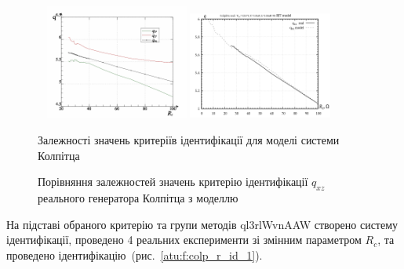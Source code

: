\documentclass[a4paper,13pt]{atuaref}
\begin{document}
\begin{figure}[htb!]
\begin{center}
  ~ \hfill
  \includegraphics[width=0.42\textwidth]{p6/p/colp_read_q-p_Rc_q.png}
  \hfill
  \includegraphics[width=0.42\textwidth]{p6/p/colp_q_cml.png}
  \hfill ~
\end{center}
\vspace{-2.0ex}
\parbox[t]{0.45\textwidth}{
  \caption{Залежності значень критеріїв ідентифікації для моделі системи Колпітца}
  \label{atu:f:colp_bjt_q-p_Rc_q}
}
\hfill
\parbox[t]{0.45\textwidth}{
  \caption{Порівняння залежностей значень критерію ідентифікації $q_{xz}$ реального генератора Колпітца з моделлю}
  \label{atu:f:colp_q_cml}
}
\end{figure}

На підставі обраного критерію та групи методів ql3rlWvnAAW створено систему ідентифікації,
проведено 4 реальних експерименти зі змінним параметром $R_c$,
та проведено ідентифікацію~(рис.~\ref{atu:f:colp_r_id_1}).
\end{document}
